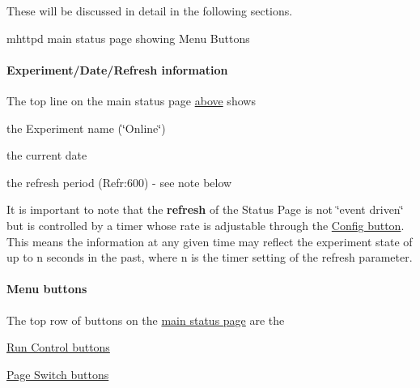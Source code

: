 These will be discussed in detail in the following sections. \par
 \label{RC_mhttpd_status_page_features_RC_mhttpd_main_status_new}
\hypertarget{RC_mhttpd_status_page_features_RC_mhttpd_main_status_new}{}
 \begin{center} mhttpd main status page showing Menu Buttons \par
\par
\par
  \end{center}  \par
\hypertarget{RC_mhttpd_status_page_features_RC_mhttpd_status_title}{}\paragraph{Experiment/Date/Refresh information}\label{RC_mhttpd_status_page_features_RC_mhttpd_status_title}
The top line on the main status page \hyperlink{RC_mhttpd_status_page_features_RC_mhttpd_main_status_new}{above} shows
\begin{DoxyItemize}
\item the Experiment name (\char`\"{}Online\char`\"{})
\item the current date
\item the refresh period (Refr:600) -\/ see note below
\end{DoxyItemize}

It is important to note that the {\bfseries refresh} of the Status Page is not \char`\"{}event driven\char`\"{} but is controlled by a timer whose rate is adjustable through the \hyperlink{RC_mhttpd_status_page_features_RC_mhttpd_Config_button}{Config button}. This means the information at any given time may reflect the experiment state of up to n seconds in the past, where n is the timer setting of the refresh parameter.





\label{RC_mhttpd_status_page_features_idx_mhttpd_buttons_menu}
\hypertarget{RC_mhttpd_status_page_features_idx_mhttpd_buttons_menu}{}
 \hypertarget{RC_mhttpd_status_page_features_RC_mhttpd_status_menu_buttons}{}\paragraph{Menu buttons}\label{RC_mhttpd_status_page_features_RC_mhttpd_status_menu_buttons}
The top row of buttons on the \hyperlink{RC_mhttpd_status_page_features_RC_mhttpd_main_status_new}{main status page} are the
\begin{DoxyItemize}
\item \hyperlink{RC_mhttpd_status_page_features_RC_mhttpd_status_RC_buttons}{Run Control buttons}
\item \hyperlink{RC_mhttpd_status_page_features_RC_mhttpd_status_Page_buttons}{Page Switch buttons}
\end{DoxyItemize}

